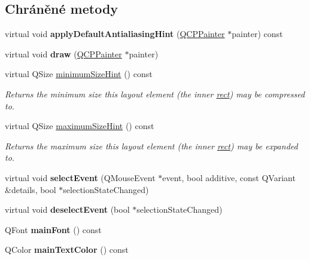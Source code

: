 \subsection*{Chráněné metody}
\begin{DoxyCompactItemize}
\item 
\hypertarget{classQCPPlotTitle_a0e2a491864bf8d8e8b159ef38e9d85bd}{}virtual void {\bfseries apply\+Default\+Antialiasing\+Hint} (\hyperlink{classQCPPainter}{Q\+C\+P\+Painter} $\ast$painter) const \label{classQCPPlotTitle_a0e2a491864bf8d8e8b159ef38e9d85bd}

\item 
\hypertarget{classQCPPlotTitle_ae4f1f8d24489628dabb7256363b097d2}{}virtual void {\bfseries draw} (\hyperlink{classQCPPainter}{Q\+C\+P\+Painter} $\ast$painter)\label{classQCPPlotTitle_ae4f1f8d24489628dabb7256363b097d2}

\item 
virtual Q\+Size \hyperlink{classQCPPlotTitle_a695e6037e72a1e129387e7e4a980faea}{minimum\+Size\+Hint} () const 
\begin{DoxyCompactList}\small\item\em Returns the minimum size this layout element (the inner \hyperlink{classQCPLayoutElement_affdfea003469aac3d0fac5f4e06171bc}{rect}) may be compressed to. \end{DoxyCompactList}\item 
virtual Q\+Size \hyperlink{classQCPPlotTitle_a2afaf11a379038e5ca58040a0eb0ae4c}{maximum\+Size\+Hint} () const 
\begin{DoxyCompactList}\small\item\em Returns the maximum size this layout element (the inner \hyperlink{classQCPLayoutElement_affdfea003469aac3d0fac5f4e06171bc}{rect}) may be expanded to. \end{DoxyCompactList}\item 
\hypertarget{classQCPPlotTitle_a22672ef2abe442b1e73b7ee04cff9bdd}{}virtual void {\bfseries select\+Event} (Q\+Mouse\+Event $\ast$event, bool additive, const Q\+Variant \&details, bool $\ast$selection\+State\+Changed)\label{classQCPPlotTitle_a22672ef2abe442b1e73b7ee04cff9bdd}

\item 
\hypertarget{classQCPPlotTitle_ac6dfce05bebdb9bd0bfacd5ff02f3325}{}virtual void {\bfseries deselect\+Event} (bool $\ast$selection\+State\+Changed)\label{classQCPPlotTitle_ac6dfce05bebdb9bd0bfacd5ff02f3325}

\item 
\hypertarget{classQCPPlotTitle_a7e74004e3a68118b16491848708a8b3a}{}Q\+Font {\bfseries main\+Font} () const \label{classQCPPlotTitle_a7e74004e3a68118b16491848708a8b3a}

\item 
\hypertarget{classQCPPlotTitle_ac1b02546563a2e76f97d78a576f82f5a}{}Q\+Color {\bfseries main\+Text\+Color} () const \label{classQCPPlotTitle_ac1b02546563a2e76f97d78a576f82f5a}

\end{DoxyCompactItemize}
